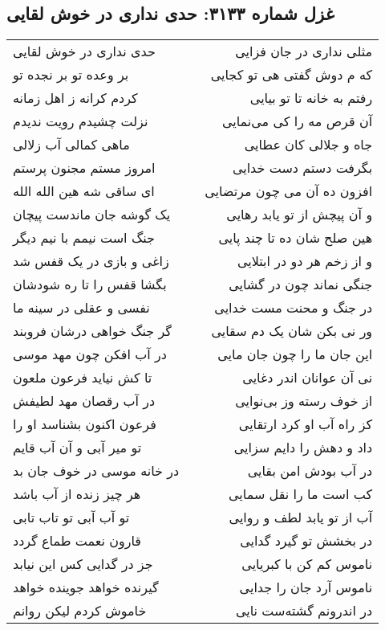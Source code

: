 \begin{center}
\section*{غزل شماره ۳۱۳۳: حدی نداری در خوش لقایی}
\label{sec:3133}
\begin{longtable}{l p{0.5cm} r}
حدی نداری در خوش لقایی
&&
مثلی نداری در جان فزایی
\\
بر وعده تو بر نجده تو
&&
که م دوش گفتی هی تو کجایی
\\
کردم کرانه ز اهل زمانه
&&
رفتم به خانه تا تو بیایی
\\
نزلت چشیدم رویت ندیدم
&&
آن قرص مه را کی می‌نمایی
\\
ماهی کمالی آب زلالی
&&
جاه و جلالی کان عطایی
\\
امروز مستم مجنون پرستم
&&
بگرفت دستم دست خدایی
\\
ای ساقی شه هین الله الله
&&
افزون ده آن می چون مرتضایی
\\
یک گوشه جان ماندست پیچان
&&
و آن پیچش از تو یابد رهایی
\\
جنگ است نیمم با نیم دیگر
&&
هین صلح شان ده تا چند پایی
\\
زاغی و بازی در یک قفس شد
&&
و از زخم هر دو در ابتلایی
\\
بگشا قفس را تا ره شودشان
&&
جنگی نماند چون در گشایی
\\
نفسی و عقلی در سینه ما
&&
در جنگ و محنت مست خدایی
\\
گر جنگ خواهی درشان فروبند
&&
ور نی بکن شان یک دم سقایی
\\
در آب افکن چون مهد موسی
&&
این جان ما را چون جان مایی
\\
تا کش نیاید فرعون ملعون
&&
نی آن عوانان اندر دغایی
\\
در آب رقصان مهد لطیفش
&&
از خوف رسته وز بی‌نوایی
\\
فرعون اکنون بشناسد او را
&&
کز راه آب او کرد ارتقایی
\\
تو میر آبی و آن آب قایم
&&
داد و دهش را دایم سزایی
\\
در خانه موسی در خوف جان بد
&&
در آب بودش امن بقایی
\\
هر چیز زنده از آب باشد
&&
کب است ما را نقل سمایی
\\
تو آب آبی تو تاب تابی
&&
آب از تو یابد لطف و روایی
\\
قارون نعمت طماع گردد
&&
در بخشش تو گیرد گدایی
\\
جز در گدایی کس این نیابد
&&
ناموس کم کن با کبریایی
\\
گیرنده خواهد جوینده خواهد
&&
ناموس آرد جان را جدایی
\\
خاموش کردم لیکن روانم
&&
در اندرونم گشته‌ست نایی
\\
\end{longtable}
\end{center}
